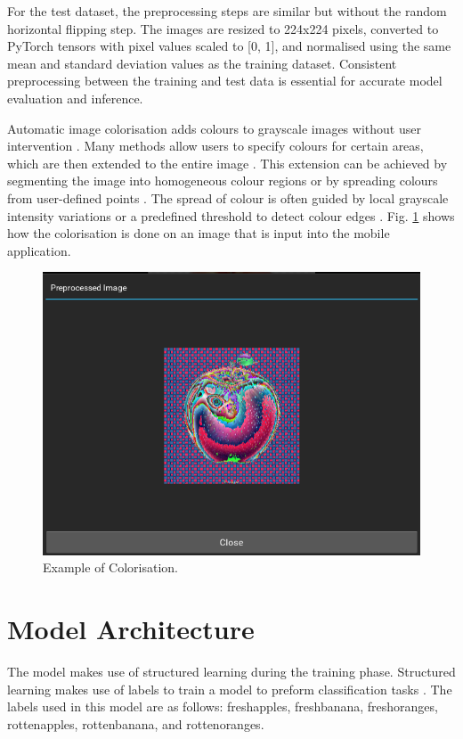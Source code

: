 \documentclass[conference]{IEEEtran}
\begin{document}
For the test dataset, the preprocessing steps are similar but without the random horizontal flipping step. The images are resized to 224x224 pixels, converted to PyTorch tensors with pixel values scaled to [0, 1], and normalised using the same mean and standard deviation values as the training dataset. Consistent preprocessing between the training and test data is essential for accurate model evaluation and inference.

Automatic image colorisation adds colours to grayscale images without user intervention \cite{b11}. Many methods allow users to specify colours for certain areas, which are then extended to the entire image \cite{b11}. This extension can be achieved by segmenting the image into homogeneous colour regions or by spreading colours from user-defined points \cite{b11}. The spread of colour is often guided by local grayscale intensity variations or a predefined threshold to detect colour edges \cite{b11}. Fig. \ref{fig1} shows how the colorisation is done on an image that is input into the mobile application.

\begin{figure}[h]
    \centering
    \includegraphics[width=\linewidth]{Pre-pros_image.png}
    \caption{Example of Colorisation.}
    \label{fig1}
\end{figure}

\section{Model Architecture}

The model makes use of structured learning during the training phase. Structured learning makes use of labels to train a model to preform classification tasks \cite{b1}. The labels used in this model are as follows: freshapples, freshbanana, freshoranges, rottenapples, rottenbanana, and rottenoranges.
\end{document}
